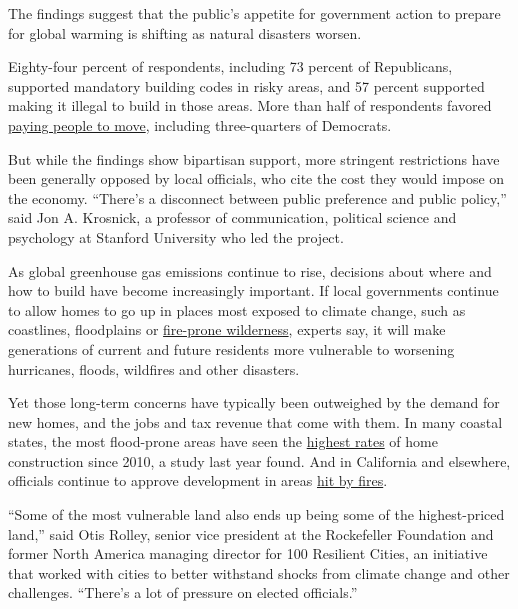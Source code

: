 The findings suggest that the public's appetite for government action to
prepare for global warming is shifting as natural disasters worsen.

Eighty-four percent of respondents, including 73 percent of Republicans,
supported mandatory building codes in risky areas, and 57 percent
supported making it illegal to build in those areas. More than half of
respondents favored
\href{https://www.nytimes3xbfgragh.onion/2020/08/26/climate/flooding-relocation-managed-retreat.html}{paying
people to move}, including three-quarters of Democrats.

But while the findings show bipartisan support, more stringent
restrictions have been generally opposed by local officials, who cite
the cost they would impose on the economy. ``There's a disconnect
between public preference and public policy,'' said Jon A. Krosnick, a
professor of communication, political science and psychology at Stanford
University who led the project.

As global greenhouse gas emissions continue to rise, decisions about
where and how to build have become increasingly important. If local
governments continue to allow homes to go up in places most exposed to
climate change, such as coastlines, floodplains or
\href{https://www.nytimes3xbfgragh.onion/2020/09/10/climate/wildfires-climate-policy.html}{fire-prone
wilderness}, experts say, it will make generations of current and future
residents more vulnerable to worsening hurricanes, floods, wildfires and
other disasters.

Yet those long-term concerns have typically been outweighed by the
demand for new homes, and the jobs and tax revenue that come with them.
In many coastal states, the most flood-prone areas have seen the
\href{https://www.nytimes3xbfgragh.onion/2019/07/31/climate/climate-change-new-homes-flooding.html}{highest
rates} of home construction since 2010, a study last year found. And in
California and elsewhere, officials continue to approve development in
areas
\href{https://www.sandiegouniontribune.com/news/environment/story/2019-05-25/san-diegos-latest-backcountry-development-to-be-built-where-california-suffered-one-of-its-most-historic-wildfires}{hit
by fires}.

``Some of the most vulnerable land also ends up being some of the
highest-priced land,'' said Otis Rolley, senior vice president at the
Rockefeller Foundation and former North America managing director for
100 Resilient Cities, an initiative that worked with cities to better
withstand shocks from climate change and other challenges. ``There's a
lot of pressure on elected officials.''

